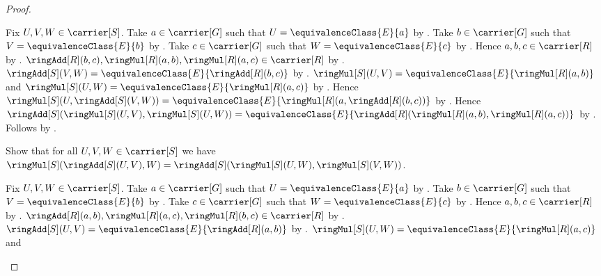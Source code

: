 \begin{proof}
\begin{subproof}
        Fix $U,V,W\in\carrier[S]$.
        Take $a\in\carrier[G]$ such that
            $U=\equivalenceClass{E}{a}$ by
            .
        Take $b\in\carrier[G]$ such that
            $V=\equivalenceClass{E}{b}$ by
            .
        Take $c\in\carrier[G]$ such that
            $W=\equivalenceClass{E}{c}$ by
            .
        Hence $a,b,c\in\carrier[R]$ by .
        $\ringAdd[R](b,c),\ringMul[R](a,b),\ringMul[R](a,c)
            \in\carrier[R]$ by .
        $\ringAdd[S](V,W)=\equivalenceClass{E}{\ringAdd[R](b,c)}$ by
            .
        $\ringMul[S](U,V)=\equivalenceClass{E}{\ringMul[R](a,b)}$ and
            $\ringMul[S](U,W)=\equivalenceClass{E}{\ringMul[R](a,c)}$ by
            .
        Hence
            $\ringMul[S](U,\ringAdd[S](V,W))
                =\equivalenceClass{E}{
                    \ringMul[R](a,\ringAdd[R](b,c))}$ by
            .
        Hence
            $\ringAdd[S](\ringMul[S](U,V),\ringMul[S](U,W))
                =\equivalenceClass{E}{
                    \ringAdd[R](\ringMul[R](a,b),\ringMul[R](a,c))}$ by
            .
        Follows by .
    \end{subproof}
    Show that for all $U,V,W\in\carrier[S]$ we have
        $\ringMul[S](\ringAdd[S](U,V),W)
            =\ringAdd[S](\ringMul[S](U,W),\ringMul[S](V,W))$.
    \begin{subproof}
        Fix $U,V,W\in\carrier[S]$.
        Take $a\in\carrier[G]$ such that
            $U=\equivalenceClass{E}{a}$ by
            .
        Take $b\in\carrier[G]$ such that
            $V=\equivalenceClass{E}{b}$ by
            .
        Take $c\in\carrier[G]$ such that
            $W=\equivalenceClass{E}{c}$ by
            .
        Hence $a,b,c\in\carrier[R]$ by .
        $\ringAdd[R](a,b),\ringMul[R](a,c),\ringMul[R](b,c)
            \in\carrier[R]$ by .
        $\ringAdd[S](U,V)=\equivalenceClass{E}{\ringAdd[R](a,b)}$ by
            .
        $\ringMul[S](U,W)=\equivalenceClass{E}{\ringMul[R](a,c)}$ and

\end{subproof}
\end{proof}
